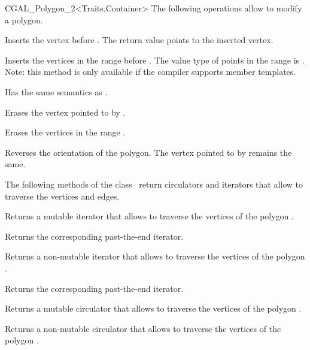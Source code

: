 \begin{ccClassTemplate}{CGAL_Polygon_2<Traits,Container>}
The following operations allow to modify a polygon.

    { Inserts the vertex  before .
      The return value points to the inserted vertex. }

    { Inserts the vertices in the range \ccStyle{[first, last)} before
      .
      \ccPrecond The value type of points in the range \ccStyle{[first,last)} is
                 .
      Note: this method is only available if the compiler supports member templates.
    }

    { Has the same semantics as .}

    { Erases the vertex pointed to by .}

    { Erases the vertices in the range \ccStyle{[first, last)}.}

    { Reverses the orientation of the polygon. The vertex pointed to by
       remains the same. }

The following methods of the class \ccClassName\ return
circulators and iterators that allow to traverse the vertices and edges.

    { Returns a mutable iterator that allows to traverse the vertices of
      the polygon .}

    { Returns the corresponding past-the-end iterator. }

    { Returns a non-mutable iterator that allows to traverse the vertices of
      the polygon .}

    { Returns the corresponding past-the-end iterator. }

    { Returns a mutable circulator that allows to traverse the vertices of
      the polygon .}

    { Returns a non-mutable circulator that allows to traverse the vertices of
      the polygon .}


\end{ccClassTemplate}
